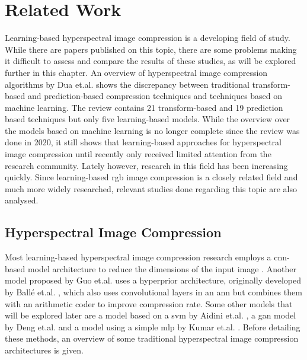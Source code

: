 \chapter{Related Work\label{cha:chapter2}}
Learning-based hyperspectral image compression is a developing field of study. While there are papers published on this topic, there are some problems making it difficult to assess and compare the results of these studies, as will be explored further in this chapter. An overview of hyperspectral image compression algorithms by Dua et.al. \citep{dua_comprehensive_2020} shows the discrepancy between traditional transform-based and prediction-based compression techniques and techniques based on machine learning. The review contains 21 transform-based and 19 prediction based techniques but only five learning-based models. While the overview over the models based on machine learning is no longer complete since the review was done in 2020, it still shows that learning-based approaches for hyperspectral image compression until recently only received limited attention from the research community. Lately however, research in this field has been increasing quickly.
Since learning-based \ac{rgb} image compression is a closely related field and much more widely researched, relevant studies done regarding this topic are also analysed.
\section{Hyperspectral Image Compression \label{sec:ch2hyperspectral}}
Most learning-based hyperspectral image compression research employs a \ac{cnn}-based model architecture to reduce the dimensions of the input image \citep{kuester_1d-convolutional_2021,kuester_transferability_2022,la_grassa_hyperspectral_2022}. Another model proposed by Guo et.al. \citep{guo_learned_2021} uses a hyperprior architecture, originally developed by Ballé et.al. \citep{balle_end--end_2017}, which also uses convolutional layers in an \ac{ann} but combines them with an arithmetic coder to improve compression rate.
Some other models that will be explored later are a model based on a \ac{svm} by Aidini et.al. \citep{aidini_hyperspectral_2019}, a \ac{gan} model by Deng et.al. \citep{deng_learning-based_2020} and a model using a simple \ac{mlp} by Kumar et.al. \citep{leal-taixe_onboard_2019}. Before detailing these methods, an overview of some traditional hyperspectral image compression architectures is given.
